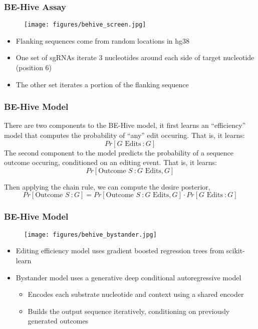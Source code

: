 \documentclass{beamer}
\begin{document}
\begin{frame}
  \frametitle{BE-Hive Assay}

  \begin{figure}[ht]
    \centering
    \texttt{[image: figures/behive\_screen.jpg]}
  \end{figure}
  \vspace{-1em}

  \begin{itemize}
  \item Flanking sequences come from random locations in hg38
  \item One set of sgRNAs iterate 3 nucleotides around each side of
    target nucleotide (position 6)
  \item The other set iterates a portion of the flanking sequence 
  \end{itemize}
\end{frame}

\begin{frame}
  \frametitle{BE-Hive Model}

  There are two components to the BE-Hive model, it first learns an
  ``efficiency'' model that computes the probability of ``any'' edit
  occuring. That is, it learns:
  $$Pr[G \text{ Edits}\ : G]$$
  The second component to the model predicts the probability of a
  sequence outcome occuring, conditioned on an editing event. That is,
  it learns:
  $$Pr[\text{Outcome } S\ : G \text{ Edits}, G]$$

  Then applying the chain rule, we can compute the desire posterior,
  \[
    Pr[\text{Outcome } S\ :  G] =
  Pr[\text{Outcome } S\ : G \text{ Edits}, G]\cdot
  Pr[G \text{ Edits}\ : G]
  \]
\end{frame}

\begin{frame}
  \frametitle{BE-Hive Model}

  \begin{figure}[h]
    \centering
    \texttt{[image: figures/behive\_bystander.jpg]}
  \end{figure}
  \vspace{-0.4em}

  \begin{itemize}
  \item Editing efficiency model uses gradient boosted regression
    trees from scikit-learn
  \item Bystander model uses a generative deep conditional
    autoregressive model
    \begin{itemize}
    \item Encodes each substrate nucleotide and context using a shared
      encoder
    \item Builds the output sequence iteratively, conditioning on
      previously generated outcomes
    \end{itemize}
  \end{itemize}
\end{frame}
\end{document}

